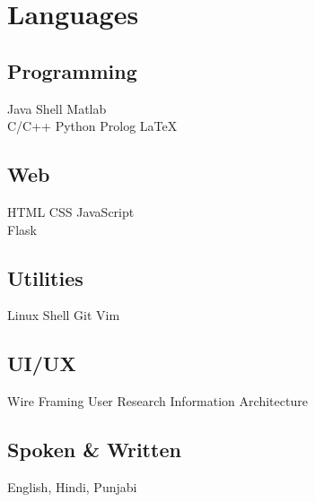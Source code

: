 \documentclass[12pt]{deedy-resume-openfont}
\begin{document}
\section{Languages}
\begin{minipage}[t]{.6\textwidth}
\subsection{Programming}
Java \textbullet{}   Shell \textbullet{}  Matlab \\
C/C++ \textbullet{} Python \textbullet{} Prolog \textbullet{} \LaTeX\ \\ 
\subsection{Web}
HTML \textbullet{}   CSS \textbullet{} JavaScript \\
Flask \\
\subsection{Utilities}
Linux Shell \textbullet{} Git \textbullet{} Vim\\
\sectionsep
\end{minipage}
\hfill
\begin{minipage}[t]{.35\textwidth}
\subsection{UI/UX}
Wire Framing \textbullet{} User Research \textbullet{} Information Architecture\\
\subsection{Spoken \& Written}
 English, Hindi, Punjabi\\
\end{minipage}
\end{document}
